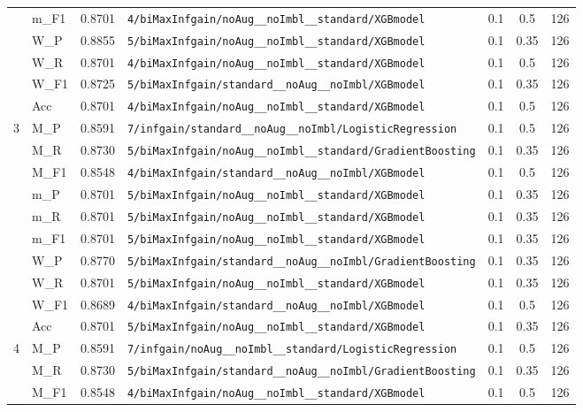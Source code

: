 \begin{table}[htbp]
\begin{tabular}{|c|l|c|>{\ttfamily\footnotesize}p{7.2cm}|c|c|c|}
 & m\_F1 & 0.8701 & \texttt{4/biMaxInfgain/noAug\_\_noImbl\_\_standard/XGBmodel} & 0.1 & 0.5  & 126 \\ 
 & W\_P & 0.8855 & \texttt{5/biMaxInfgain/noAug\_\_noImbl\_\_standard/XGBmodel} & 0.1 & 0.35  & 126 \\ 
 & W\_R & 0.8701 & \texttt{4/biMaxInfgain/noAug\_\_noImbl\_\_standard/XGBmodel} & 0.1 & 0.5  & 126 \\ 
 & W\_F1 & 0.8725 & \texttt{5/biMaxInfgain/standard\_\_noAug\_\_noImbl/XGBmodel} & 0.1 & 0.35  & 126 \\ 
 & Acc & 0.8701 & \texttt{4/biMaxInfgain/noAug\_\_noImbl\_\_standard/XGBmodel} & 0.1 & 0.5  & 126 \\ 
\hline
\multirow{10}{*}{3} & M\_P & 0.8591 & \texttt{7/infgain/standard\_\_noAug\_\_noImbl/LogisticRegression} & 0.1 & 0.5  & 126 \\ 
 & M\_R & 0.8730 & \texttt{5/biMaxInfgain/noAug\_\_noImbl\_\_standard/GradientBoosting} & 0.1 & 0.35  & 126 \\ 
 & M\_F1 & 0.8548 & \texttt{4/biMaxInfgain/standard\_\_noAug\_\_noImbl/XGBmodel} & 0.1 & 0.5  & 126 \\ 
 & m\_P & 0.8701 & \texttt{5/biMaxInfgain/noAug\_\_noImbl\_\_standard/XGBmodel} & 0.1 & 0.35  & 126 \\ 
 & m\_R & 0.8701 & \texttt{5/biMaxInfgain/noAug\_\_noImbl\_\_standard/XGBmodel} & 0.1 & 0.35  & 126 \\ 
 & m\_F1 & 0.8701 & \texttt{5/biMaxInfgain/noAug\_\_noImbl\_\_standard/XGBmodel} & 0.1 & 0.35  & 126 \\ 
 & W\_P & 0.8770 & \texttt{5/biMaxInfgain/standard\_\_noAug\_\_noImbl/GradientBoosting} & 0.1 & 0.35  & 126 \\ 
 & W\_R & 0.8701 & \texttt{5/biMaxInfgain/noAug\_\_noImbl\_\_standard/XGBmodel} & 0.1 & 0.35  & 126 \\ 
 & W\_F1 & 0.8689 & \texttt{4/biMaxInfgain/standard\_\_noAug\_\_noImbl/XGBmodel} & 0.1 & 0.5  & 126 \\ 
 & Acc & 0.8701 & \texttt{5/biMaxInfgain/noAug\_\_noImbl\_\_standard/XGBmodel} & 0.1 & 0.35  & 126 \\ 
\hline
\multirow{10}{*}{4} & M\_P & 0.8591 & \texttt{7/infgain/noAug\_\_noImbl\_\_standard/LogisticRegression} & 0.1 & 0.5  & 126 \\ 
 & M\_R & 0.8730 & \texttt{5/biMaxInfgain/standard\_\_noAug\_\_noImbl/GradientBoosting} & 0.1 & 0.35  & 126 \\ 
 & M\_F1 & 0.8548 & \texttt{4/biMaxInfgain/noAug\_\_noImbl\_\_standard/XGBmodel} & 0.1 & 0.5  & 126 \\ 

\end{tabular}
\end{table}
